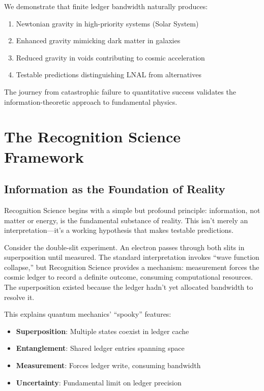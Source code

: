 \documentclass[12pt,letterpaper]{article}
\begin{document}
We demonstrate that finite ledger bandwidth naturally produces:
\begin{enumerate}
\item Newtonian gravity in high-priority systems (Solar System)
\item Enhanced gravity mimicking dark matter in galaxies
\item Reduced gravity in voids contributing to cosmic acceleration
\item Testable predictions distinguishing LNAL from alternatives
\end{enumerate}

The journey from catastrophic failure to quantitative success validates the information-theoretic approach to fundamental physics.

\section{The Recognition Science Framework}
\label{sec:framework}

\subsection{Information as the Foundation of Reality}

Recognition Science begins with a simple but profound principle: information, not matter or energy, is the fundamental substance of reality. This isn't merely an interpretation---it's a working hypothesis that makes testable predictions.

Consider the double-slit experiment. An electron passes through both slits in superposition until measured. The standard interpretation invokes ``wave function collapse,'' but Recognition Science provides a mechanism: measurement forces the cosmic ledger to record a definite outcome, consuming computational resources. The superposition existed because the ledger hadn't yet allocated bandwidth to resolve it.

This explains quantum mechanics' ``spooky'' features:
\begin{itemize}
\item \textbf{Superposition}: Multiple states coexist in ledger cache
\item \textbf{Entanglement}: Shared ledger entries spanning space
\item \textbf{Measurement}: Forces ledger write, consuming bandwidth
\item \textbf{Uncertainty}: Fundamental limit on ledger precision
\end{itemize}
\end{document}
